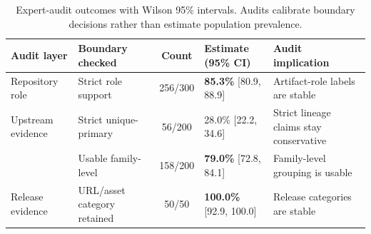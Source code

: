 \begin{table}[!tbp]
\centering
\caption{Expert-audit outcomes with Wilson 95\% intervals. Audits calibrate boundary decisions rather than estimate population prevalence.}
\label{tab:audit-wilson-ci}
\small
\setlength{\tabcolsep}{5pt}
\renewcommand{\arraystretch}{1.14}
\begin{tabularx}{0.94\textwidth}{@{}p{}p{}cp{}Y@{}}
\toprule
\textbf{Audit layer} & \textbf{Boundary checked} & \textbf{Count} & \textbf{Estimate (95\% CI)} & \textbf{Audit implication} \\
\midrule
Repository role & Strict role support & 256/300 & \textbf{85.3\%} [80.9, 88.9] & Artifact-role labels are stable \\
\midrule
Upstream evidence & Strict unique-primary & 56/200 & 28.0\% [22.2, 34.6] & Strict lineage claims stay conservative \\
 & Usable family-level & 158/200 & \textbf{79.0\%} [72.8, 84.1] & Family-level grouping is usable \\
\midrule
Release evidence & URL/asset category retained & 50/50 & \textbf{100.0\%} [92.9, 100.0] & Release categories are stable \\
\bottomrule
\end{tabularx}
\renewcommand{\arraystretch}{1.0}
\end{table}

